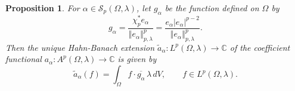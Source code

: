 \documentclass[letterpaper,11pt,reqno]{amsart}
\theoremstyle{plain}
\newtheorem{proposition}[equation]{Proposition}
\theoremstyle{definition}
\theoremstyle{remark}
\theoremstyle{remark}
\numberwithin{equation}{section}
\newcommand{\abs}[1]{\left\vert#1\right\vert}
\newcommand{\norm}[1]{\left\Vert#1\right\Vert}
\newcommand{\ol}{\overline}
\newcommand{\wt}{\widetilde}
\newcommand{\cx}{{\mathbb C}}
\begin{document}
\begin{proposition}\label{prop-hbext}
For $\alpha \in \mathcal{S}_p(\Omega,\lambda)$, let $g_\alpha$ be the function defined on $\Omega$ by
\begin{equation}\label{eq-galpha}
g_\alpha =\frac{\chi_p^*e_\alpha}{\norm{e_\alpha}_{p,\lambda}^p} = \frac{e_\alpha\abs{e_\alpha}^{p-2}}{\norm{e_\alpha}_{p,\lambda}^p}.
\end{equation}
Then the unique Hahn-Banach extension $\wt{a}_\alpha: L^p(\Omega, \lambda)\to \cx$ of the coefficient functional $a_\alpha:A^p(\Omega, \lambda)\to \cx$ is given by
\begin{equation}\label{eq-aalphatilde}
\wt{a}_\alpha(f)= \int_\Omega f\cdot \ol{g_\alpha}\,\lambda \,dV, \qquad f\in L^p(\Omega, \lambda).
\end{equation}
\end{proposition}
\end{document}
